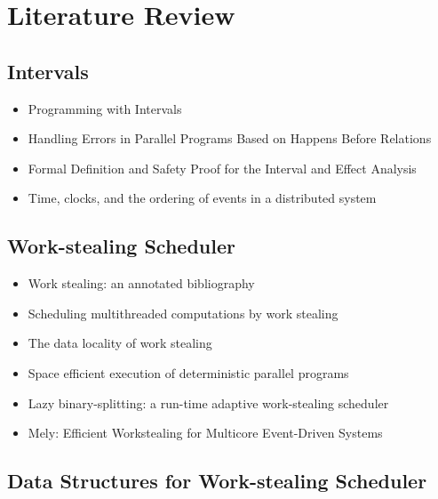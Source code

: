 
\chapter{Literature Review}
\label{cha:literature-review}

\section{Intervals}
\label{sec:lr-intervals}

\begin{itemize}
\item Programming with Intervals \cite{Matsakis2009a}
\item Handling Errors in Parallel Programs Based on Happens Before
  Relations \cite{Matsakis2009b}
\item Formal Definition and Safety Proof for the Interval and Effect
  Analysis \cite{Matsakis2009}
\item Time, clocks, and the ordering of events in a distributed system
  \cite{Lamport1978}
\end{itemize}


\section{Work-stealing Scheduler}
\label{sec:lr-work-stealing-scheduler}

\begin{itemize}
\item Work stealing: an annotated bibliography \cite{Neill2001}
\item Scheduling multithreaded computations by work stealing
  \cite{Blumofe1999}
\item The data locality of work stealing \cite{Acar2002}
\item Space efficient execution of deterministic parallel programs
  \cite{Simpson1999}
\item Lazy binary-splitting: a run-time adaptive work-stealing
  scheduler \cite{Tzannes2010}
\item Mely: Efficient Workstealing for Multicore Event-Driven Systems
  \cite{Gaud2010}
\end{itemize}


\section{Data Structures for Work-stealing Scheduler}
\label{sec:lr-data-structures-for-work-stealing-scheduler}

